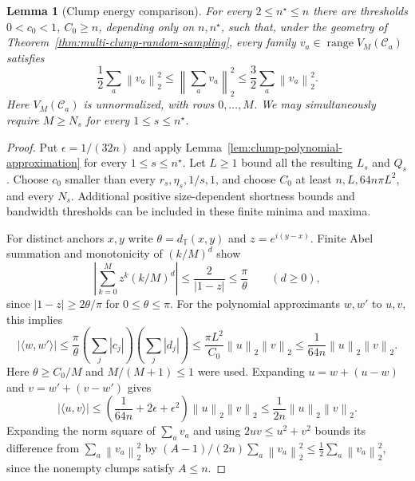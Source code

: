 \documentclass[11pt]{article}
\newtheorem{lemma}[theorem]{Lemma}
\theoremstyle{remark}\newtheorem{remark}[theorem]{Remark}
\newcommand{\T}{\mathbb T}
\newcommand{\norm}[1]{\left\lVert#1\right\rVert}
\newcommand{\abs}[1]{\left|#1\right|}
\begin{document}
\begin{lemma}[Clump energy comparison]
\label{lem:clump-energy}
For every $2\le n^\star\le n$ there are thresholds $0<c_0<1$,
$C_0\ge n$, depending only on $n,n^\star$, such that, under the geometry
of Theorem~\ref{thm:multi-clump-random-sampling}, every family
$v_a\in\operatorname{range}V_M(\mathcal C_a)$ satisfies
\begin{equation}
 \label{eq:clump-energy-comparison}
 \frac12\sum_a\norm{v_a}_2^2\le\norm{\sum_av_a}_2^2
 \le\frac32\sum_a\norm{v_a}_2^2.
\end{equation}
Here $V_M(\mathcal C_a)$ is unnormalized, with rows $0,\ldots,M$.
We may simultaneously require $M\ge N_s$ for every $1\le s\le n^\star$.
\end{lemma}
\begin{proof}
Put $\epsilon=1/(32n)$ and apply
Lemma~\ref{lem:clump-polynomial-approximation} for every $1\le s\le n^\star$.
Let $L\ge1$ bound all the resulting $L_s$ and $Q_s$. Choose $c_0$ smaller
than every $r_s,\eta_s,1/s,1$, and choose $C_0$ at least
$n,L,64n\pi L^2$, and every $N_s$. Additional positive size-dependent
shortness bounds and bandwidth thresholds can be included in these finite
minima and maxima.

For distinct anchors $x,y$ write $\theta=d_\T(x,y)$ and $z=e^{i(y-x)}$.
Finite Abel summation and monotonicity of $(k/M)^d$ show
\[
 \abs{\sum_{k=0}^{M}z^k(k/M)^d}\le\frac2{\abs{1-z}}
 \le\frac\pi\theta \qquad(d\ge0),
\]
since $\abs{1-z}\ge2\theta/\pi$ for $0\le\theta\le\pi$.
For the polynomial approximants $w,w'$ to $u,v$, this implies
\[
 \abs{\langle w,w'\rangle}
 \le\frac\pi\theta\left(\sum_j\abs{c_j}\right)
                         \left(\sum_j\abs{d_j}\right)
 \le\frac{\pi L^2}{C_0}\norm u_2\norm v_2
 \le\frac1{64n}\norm u_2\norm v_2.
\]
Here $\theta\ge C_0/M$ and $M/(M+1)\le1$ were used. Expanding
$u=w+(u-w)$ and $v=w'+(v-w')$ gives
\[
 \abs{\langle u,v\rangle}
 \le\left(\frac1{64n}+2\epsilon+\epsilon^2\right)
                         \norm u_2\norm v_2
 \le\frac1{2n}\norm u_2\norm v_2.
\]
Expanding the norm square of $\sum_av_a$ and using $2uv\le u^2+v^2$
bounds its difference from $\sum_a\norm{v_a}_2^2$ by
$(A-1)/(2n)\sum_a\norm{v_a}_2^2\le\tfrac12\sum_a\norm{v_a}_2^2$,
since the nonempty clumps satisfy $A\le n$.
\end{proof}
\end{document}
